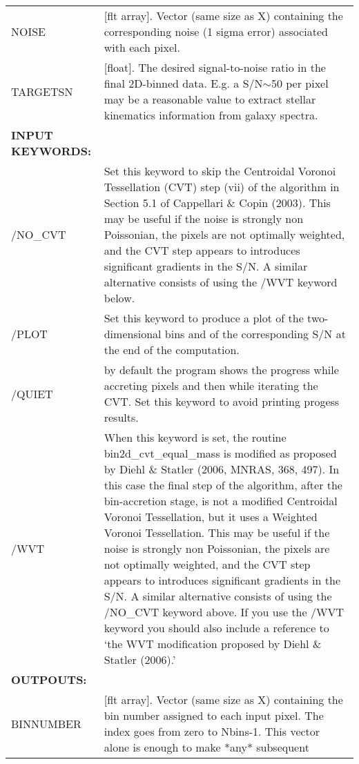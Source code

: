 \begin{center}
\begin{longtable}{p{2.7cm}| p{11.1cm}}
%
NOISE  &[flt array]. Vector (same size as X) containing the corresponding
            noise (1 sigma error) associated with each pixel.\\
%
TARGETSN & [float]. The desired signal-to-noise ratio in the final
            2D-binned data. E.g. a S/N$\sim$50 per pixel may be a
            reasonable value to extract stellar kinematics
            information from galaxy spectra.\\
\hline
{\bf  INPUT KEYWORDS:}      &    \\
  /NO\_CVT&  Set this keyword to skip the Centroidal Voronoi Tessellation
           (CVT) step (vii) of the algorithm in Section 5.1 of
           Cappellari \& Copin (2003).
           This may be useful if the noise is strongly non Poissonian,
           the pixels are not optimally weighted, and the CVT step
           appears to introduces significant gradients in the S/N.
           A similar alternative consists of using the /WVT keyword below.\\
%
    /PLOT&   Set this keyword to produce a plot of the two-dimensional
           bins and of the corresponding S/N at the end of the
           computation.\\
%
   /QUIET&   by default the program shows the progress while accreting
           pixels and then while iterating the CVT. Set this keyword
           to avoid printing progess results.\\
%
     /WVT&   When this keyword is set, the routine bin2d\_cvt\_equal\_mass is
           modified as proposed by Diehl \& Statler (2006, MNRAS, 368, 497).
           In this case the final step of the algorithm, after the bin-accretion
           stage, is not a modified Centroidal Voronoi Tessellation, but it uses
           a Weighted Voronoi Tessellation.
           This may be useful if the noise is strongly non Poissonian,
           the pixels are not optimally weighted, and the CVT step
           appears to introduces significant gradients in the S/N.
           A similar alternative consists of using the /NO\_CVT keyword above.
           If you use the /WVT keyword you should also include a reference to
           `the WVT modification proposed by Diehl \& Statler (2006).'\\
%
\hline
{\bf  OUTPOUTS:}        &    \\
   BINNUMBER &[flt array]. Vector (same size as X) containing the bin number assigned
           to each input pixel. The index goes from zero to Nbins-1.
           This vector alone is enough to make *any* subsequent

\end{longtable}
\end{center}
